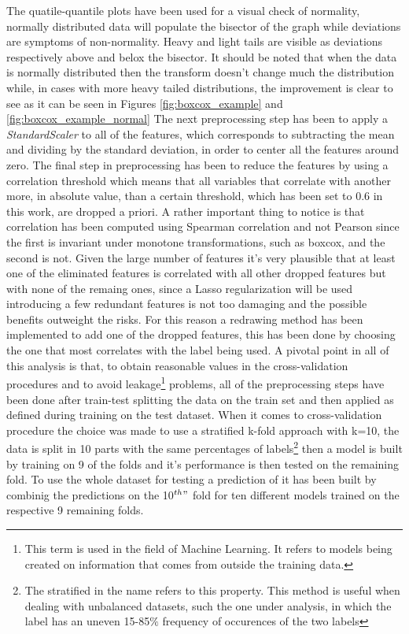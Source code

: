 The quatile-quantile plots have been used for a visual check of normality, normally distributed data will populate the bisector of the graph while deviations are symptoms of non-normality. Heavy and light tails are visible as deviations respectively above and belox the bisector.
 It should be noted that when the data is normally distributed then the transform doesn't change much the distribution while, in cases with more heavy tailed distributions, the improvement is clear to see as it can be seen in Figures \ref{fig:boxcox_example} and \ref{fig:boxcox_example_normal}
The next preprocessing step has been to apply a \textit{StandardScaler} to all of the features, which corresponds to subtracting the mean and dividing by the standard deviation, in order to center all the features around zero. The final step in preprocessing has been to reduce the features by using a correlation threshold which means that all variables that correlate with another more, in absolute value, than a certain threshold, which has been set to 0.6 in this work, are dropped a priori. A rather important thing to notice is that correlation has been computed using Spearman correlation and not Pearson since the first is invariant under monotone transformations, such as boxcox, and the second is not.
Given the large number of features it's very plausible that at least one of the eliminated features is correlated with all other dropped features but with none of the remaing ones, since a Lasso regularization will be used introducing a few redundant features is not too damaging and the possible benefits outweight the risks. For this reason a redrawing method has been implemented to add one of the dropped features, this has been done by choosing the one that most correlates with the label being used.
A pivotal point in all of this analysis is that, to obtain reasonable values in the cross-validation procedures and to avoid leakage\footnote{This term is used in the field of Machine Learning. It refers to models being created on information that comes from outside the training data.} problems, all of the preprocessing steps have been done after train-test splitting the data on the train set and then applied as defined during training on the test dataset.
When it comes to cross-validation procedure the choice was made to use a stratified k-fold approach with k=10, the data is split in 10 parts with the same percentages of labels\footnote{The stratified in the name refers to this property. This method is useful when dealing with unbalanced datasets, such the one under analysis, in which the label has an uneven 15-85$\%$ frequency of occurences of the two labels} then a model is built by training on 9 of the folds and it's performance is then tested on the remaining fold. To use the whole dataset for testing a prediction of it has been built by combinig the predictions on the 10$^{th}"$ fold for ten different models trained on the respective 9 remaining folds.
